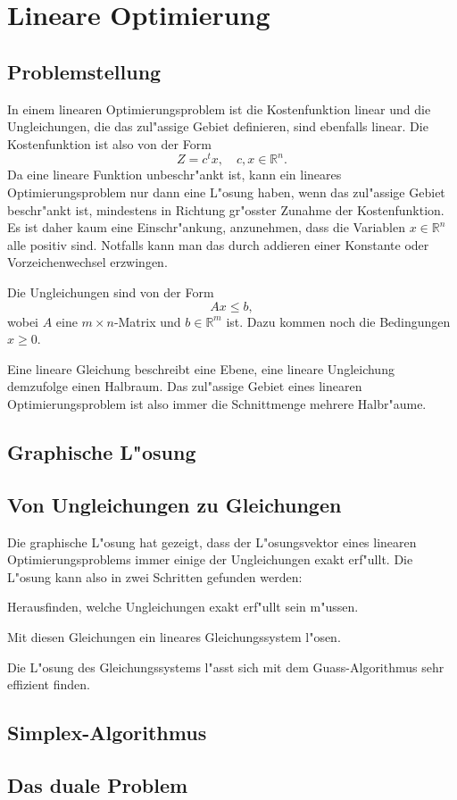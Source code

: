 \chapter{Lineare Optimierung\label{chapter-lineare-optimierung}}

\section{Problemstellung}
In einem linearen Optimierungsproblem ist die Kostenfunktion linear
und die Ungleichungen, die das zul"assige Gebiet definieren, sind
ebenfalls linear. 
Die Kostenfunktion ist also von der Form
\[
Z=c^tx,\quad c,x\in\mathbb R^n.
\]
Da eine lineare Funktion unbeschr"ankt ist, kann ein lineares
Optimierungsproblem nur dann eine L"osung haben, wenn das zul"assige
Gebiet beschr"ankt ist, mindestens in Richtung gr"osster Zunahme der
Kostenfunktion. Es ist daher kaum eine Einschr"ankung, anzunehmen, dass 
die Variablen $x\in\mathbb R^n$ alle positiv sind. Notfalls kann man 
das durch addieren einer Konstante oder Vorzeichenwechsel erzwingen.

Die Ungleichungen sind von der Form
\[
Ax\le b,
\]
wobei $A$ eine $m\times n$-Matrix und $b\in\mathbb R^m$ ist.
Dazu kommen noch die Bedingungen $x\ge 0$.

Eine lineare Gleichung beschreibt eine Ebene, eine
lineare Ungleichung demzufolge einen Halbraum. Das zul"assige Gebiet
eines linearen Optimierungsproblem ist also immer die Schnittmenge
mehrere Halbr"aume.

\section{Graphische L"osung}

\section{Von Ungleichungen zu Gleichungen}
Die graphische L"osung hat gezeigt, dass der L"osungsvektor eines
linearen Optimierungsproblems immer einige der Ungleichungen exakt
erf"ullt. Die L"osung kann also in zwei Schritten gefunden werden:
\begin{compactenum}
\item Herausfinden, welche Ungleichungen exakt erf"ullt sein m"ussen.
\item Mit diesen Gleichungen ein lineares Gleichungssystem l"osen.
\end{compactenum}
Die L"osung des Gleichungssystems l"asst sich mit dem Guass-Algorithmus
sehr effizient finden.

\section{Simplex-Algorithmus}

\section{Das duale Problem}
